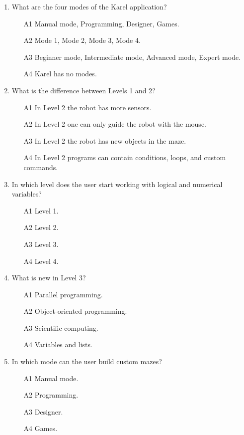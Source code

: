 \begin{enumerate}
\item What are the four modes of the Karel application?
\begin{enumerate}
\item[A1] Manual mode, Programming, Designer, Games.
\item[A2] Mode 1, Mode 2, Mode 3, Mode 4.
\item[A3] Beginner mode, Intermediate mode, Advanced mode, Expert mode.
\item[A4] Karel has no modes.
\end{enumerate}
\item What is the difference between Levels 1 and 2?
\begin{enumerate}
\item[A1] In Level 2 the robot has more sensors. 
\item[A2] In Level 2 one can only guide the robot with the mouse.
\item[A3] In Level 2 the robot has new objects in the maze.
\item[A4] In Level 2 programs can contain conditions, loops, and custom commands. 
\end{enumerate}
\item In which level does the user start working with logical and numerical variables?
\begin{enumerate}
\item[A1] Level 1.
\item[A2] Level 2.
\item[A3] Level 3.
\item[A4] Level 4.
\end{enumerate}
\item What is new in Level 3?
\begin{enumerate}
\item[A1] Parallel programming.
\item[A2] Object-oriented programming.
\item[A3] Scientific computing.
\item[A4] Variables and lists.
\end{enumerate}
\item In which mode can the user build custom mazes?
\begin{enumerate}
\item[A1] Manual mode.
\item[A2] Programming.
\item[A3] Designer.
\item[A4] Games.
\end{enumerate}
\end{enumerate}

